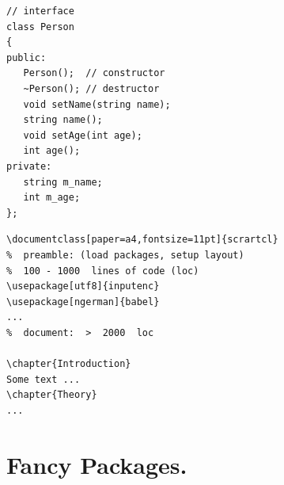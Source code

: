 \begin{filecontents*}{\democodefile}
\begin{lstlisting}[style=lstStyleCpp]
// interface
class Person
{
public:
   Person();  // constructor
   ~Person(); // destructor
   void setName(string name);
   string name();
   void setAge(int age);
   int age();
private:
   string m_name;
   int m_age;
};
\end{lstlisting}
\end{filecontents*}

%

\begin{filecontents*}{\democodefile}
\begin{lstlisting}[style=lstStyleLaTeX,
   caption={[LaTeX Listings] Lines of code in a typical LaTeX document},
   label=lstLaTeXLinesOfCode]
\documentclass[paper=a4,fontsize=11pt]{scrartcl}
%  preamble: (load packages, setup layout)
%  100 - 1000  lines of code (loc)
\usepackage[utf8]{inputenc}
\usepackage[ngerman]{babel}
...
%  document:  >  2000  loc

\chapter{Introduction}
Some text ...
\chapter{Theory}
...

\end{lstlisting}
\end{filecontents*}

%


 
\clearpage
\section{Fancy Packages.}


